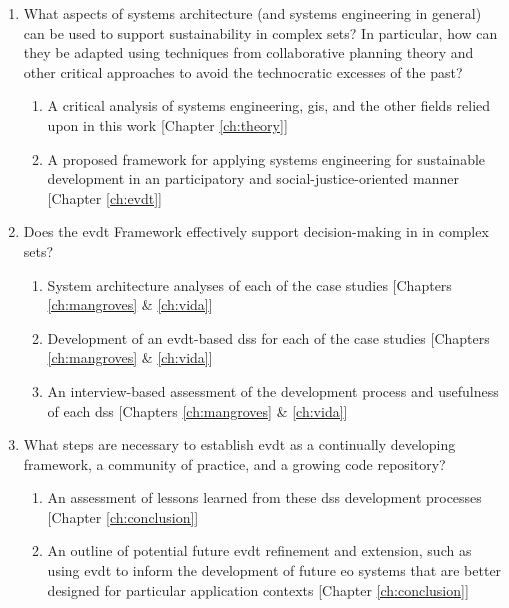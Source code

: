 \begin{enumerate}[itemsep=0pt,parsep=0pt]
	\item{What aspects of systems architecture (and systems engineering in general) can be used to support sustainability in complex \ac{sets}? In particular, how can they be adapted using techniques from collaborative planning theory and other critical approaches to avoid the technocratic excesses of the past?}
	\begin{enumerate}[label=\emph{\alph*},itemsep=0pt,parsep=0pt]
		\item{A critical analysis of systems engineering, \ac{gis}, and the other fields relied upon in this work [Chapter \ref{ch:theory}] }
		\item{A proposed framework for applying systems engineering for sustainable development in an participatory and social-justice-oriented manner} [Chapter \ref{ch:evdt}]
	\end{enumerate}
	\item{Does the \ac{evdt} Framework effectively support decision-making in in complex \ac{sets}?}
	\begin{enumerate}[label=\emph{\alph*},itemsep=0pt,parsep=0pt]
		\item{System architecture analyses of each of the case studies [Chapters \ref{ch:mangroves} \& \ref{ch:vida}]} 
		\item{Development of an \ac{evdt}-based \ac{dss} for each of the case studies [Chapters \ref{ch:mangroves} \& \ref{ch:vida}]} 
		\item{An interview-based assessment of the development process and usefulness of each \ac{dss} [Chapters \ref{ch:mangroves} \& \ref{ch:vida}]} 
	\end{enumerate}
	\item{What steps are necessary to establish \ac{evdt} as a continually developing framework, a community of practice, and a growing code repository?}
	\begin{enumerate}[label=\emph{\alph*},itemsep=0pt,parsep=0pt]
		\item{An assessment of lessons learned from these \ac{dss} development processes [Chapter \ref{ch:conclusion}]} 
		\item{An outline of potential future \ac{evdt} refinement and extension, such as using \ac{evdt} to inform the development of future \ac{eo} systems that are better designed for particular application contexts [Chapter \ref{ch:conclusion}]}
	\end{enumerate}
\end{enumerate}

